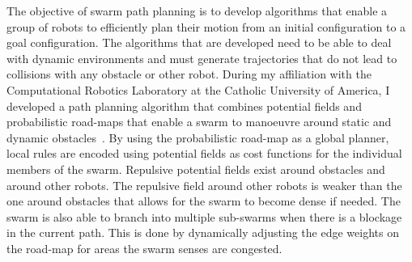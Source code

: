 \documentclass{article}
\begin{document}
The objective of swarm path planning is to develop algorithms that enable a
group of robots to efficiently plan their motion from an initial configuration
to a goal configuration. The algorithms that are developed need to be able to
deal with dynamic environments and must generate trajectories that do not lead
to collisions with any obstacle or other robot. During my affiliation with the
Computational Robotics Laboratory at the Catholic University of America, I
developed a path planning algorithm that combines potential fields and
probabilistic road-maps that enable a swarm to manoeuvre around static and
dynamic obstacles~\cite{crops, dcrops}. By using the probabilistic road-map as
a global planner, local rules are encoded using potential fields as cost
functions for the individual members of the swarm.  Repulsive potential fields
exist around obstacles and around other robots. The repulsive field around
other robots is weaker than the one around obstacles that allows for the swarm
to become dense if needed. The swarm is also able to branch into multiple
sub-swarms when there is a blockage in the current path.  This is done by
dynamically adjusting the edge weights on the road-map for areas the swarm
senses are congested.
\end{document}
